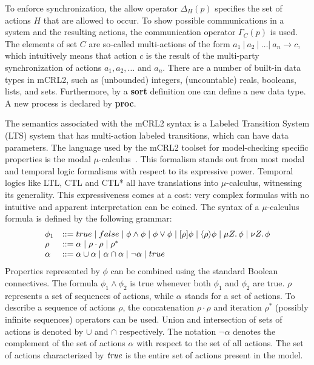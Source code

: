 \documentclass[letter]{llncs}
\begin{document}
To enforce synchronization, the allow operator ${\Delta_H(p)}$ specifies the set of actions $H$ that are allowed
to occur. To show possible communications in a system and the resulting actions, the communication operator
${\Gamma_C(p)}$ is used. The elements of set $C$ are so-called multi-actions of the form $a_1\ |\ a_2\ |\ \dots |\ a_n \rightarrow c$, which intuitively
means that action $c$ is the result of the multi-party synchronization of actions $a_1 , a_2 , \dots $ and $a_n$.
There are a number of built-in data types in mCRL2, such as (unbounded) integers, (uncountable)
reals, booleans, lists, and sets. 
Furthermore, by a \textbf{sort} definition one can define a new data type. A new process
is declared by \textbf{proc}.

The semantics associated with the mCRL2 syntax is a Labeled Transition System (LTS)
system that has multi-action labeled transitions, which can have data parameters. The language used by the mCRL2
toolset for model-checking specific properties is the modal
$\mu$-calculus~\cite{Emerson97modelchecking}. This formalism stands out from most modal and temporal logic formalisms with respect to its
expressive power. Temporal logics like LTL, CTL and CTL* all have translations into $\mu$-calculus,
witnessing its generality. This expressiveness comes at a cost: very complex formulas with no intuitive and apparent interpretation can be coined. 
The syntax of a $\mu$-calculus formula is defined by the following grammar:
\[
\begin{array}{ll}

\phi_1 & ::= true \mid false \mid \phi\wedge\phi \mid \phi\vee\phi \mid [\rho]\phi \mid \langle\rho\rangle\phi \mid \mu Z\ldotp\phi \mid \nu Z\ldotp\phi \\
\rho & ::= \alpha \mid \rho\cdot\rho \mid \rho^* \\
\alpha & ::= \alpha\cup\alpha \mid \alpha\cap\alpha \mid\neg\alpha \mid true\\
\end{array}
\]
Properties represented by $\phi$ can be combined using the standard Boolean connectives.
The formula $\phi_1\wedge\phi_2$ is true whenever both $\phi_1$ and $\phi_2$ are true.
$\rho$ represents a set of sequences of actions, while $\alpha$ stands for a set of actions.
To describe a sequence of actions $\rho$, the concatenation $\rho\cdot\rho$ and iteration $\rho^*$ (possibly infinite sequences) operators can be used.
Union and intersection of sets of actions is denoted by $\cup$ and $\cap$ respectively. 
The notation $\neg\alpha$ denotes the complement of the set of actions $\alpha$ with respect to the set of all actions. 
The set of actions characterized by $\emph{true}$ is the entire set of actions present in the model.
\end{document}
